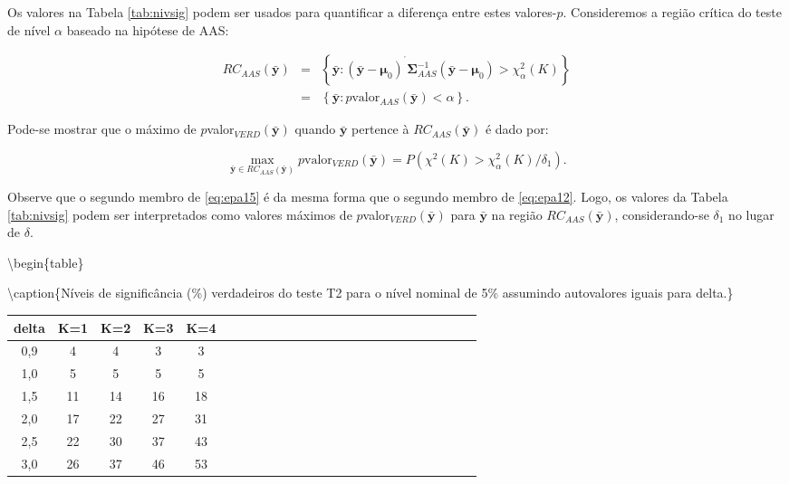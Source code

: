 \documentclass[]{book}
\theoremstyle{definition}
\theoremstyle{definition}
\theoremstyle{definition}
\theoremstyle{remark}
\begin{document}
Os valores na Tabela \ref{tab:nivsig} podem ser usados para quantificar
a diferença entre estes valores-\(p\). Consideremos a região crítica do
teste de nível \(\alpha\) baseado na hipótese de AAS:

\begin{eqnarray}
RC_{AAS}\left( \mathbf{\bar{y}}\right) &=&\left\{ \mathbf{\bar{y}:}\left( 
\mathbf{\bar{y}-\mu }_{0}\right) ^{^{\prime }}\mathbf{\Sigma }
_{AAS}^{-1}\left( \mathbf{\bar{y}-\mu }_{0}\right) >\chi _{\alpha
}^{2}\left( K\right) \right\} \label{eq:epa14}  \\
&=&\left\{ \mathbf{\bar{y}:}p\mbox{valor}_{AAS}\left( \mathbf{\bar{y}}
\right) <\alpha \right\}.  \nonumber
\end{eqnarray}

Pode-se mostrar que o máximo de
\(p\)valor\(_{VERD}\left( \mathbf{\bar{y}}\right)\) quando
\(\mathbf{\bar{y}}\) pertence à
\(RC_{AAS}\left( \mathbf{\bar{y}}\right)\) é dado por:

\begin{equation}
\max_{\mathbf{\bar{y}\in }RC_{AAS}\left( \mathbf{\bar{y}}\right) }p
\mbox{valor}_{VERD}\left( \mathbf{\bar{y}}\right) =P\left( \chi ^{2}\left(K\right) >\chi _{\alpha }^{2}\left( K\right) /\delta _{1}\right).
\label{eq:epa15}
\end{equation}

Observe que o segundo membro de \eqref{eq:epa15} é da mesma forma que o
segundo membro de \eqref{eq:epa12}. Logo, os valores da Tabela
\ref{tab:nivsig} podem ser interpretados como valores máximos de
\(p\)valor\(_{VERD}\left( \mathbf{\bar{y}}\right)\) para
\(\mathbf{\bar{y}}\) na região
\(RC_{AAS}\left(\mathbf{\bar{y}}\right)\), considerando-se
\(\delta_{1}\) no lugar de \(\delta\).

\textbackslash{}begin\{table\}

\textbackslash{}caption\{\label{tab:nivsig}Níveis de significância (\%)
verdadeiros do teste T2 para o nível nominal de 5\% assumindo
autovalores iguais para delta.\} \centering

\begin{tabular}[t]{ccccccccccccccccccccccccc}
\toprule
delta & K=1 & K=2 & K=3 & K=4\\
\midrule
0,9 & 4 & 4 & 3 & 3\\
1,0 & 5 & 5 & 5 & 5\\
1,5 & 11 & 14 & 16 & 18\\
2,0 & 17 & 22 & 27 & 31\\
2,5 & 22 & 30 & 37 & 43\\
3,0 & 26 & 37 & 46 & 53\\
\bottomrule
\end{tabular}
\end{document}
